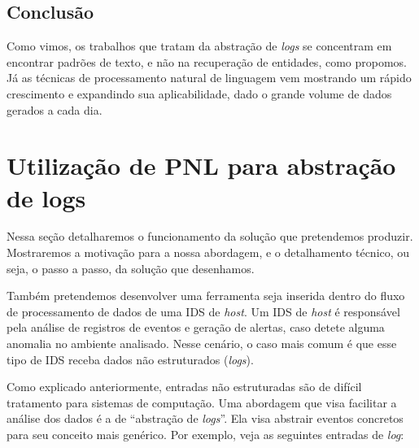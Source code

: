 \documentclass[
	12pt,				%
	openright,			%
	twoside,			%
	a4paper,			%
	english,			%
	spanish,			%
	brazil,				%
	]{abntex2}
\begin{document}



\section{Conclusão}
Como vimos, os trabalhos que tratam da abstração de \emph{logs} se concentram em encontrar padrões de texto, e não na recuperação de entidades, como propomos. Já as técnicas de processamento natural de linguagem vem mostrando um rápido crescimento e expandindo sua aplicabilidade, dado o grande volume de dados gerados a cada dia.

\chapter{Utilização de PNL para abstração de logs}\label{chap:proposta}

Nessa seção detalharemos o funcionamento da solução que pretendemos produzir. Mostraremos a motivação para a nossa abordagem, e o detalhamento técnico, ou seja, o passo a passo, da solução que desenhamos.

Também pretendemos desenvolver uma ferramenta seja inserida dentro do fluxo de processamento de dados de uma IDS de \emph{host}. Um IDS de \emph{host} é responsável pela análise de registros de eventos e geração de alertas, caso detete alguma anomalia no ambiente analisado. Nesse cenário, o caso mais comum é que esse tipo de IDS receba dados não estruturados (\emph{logs}). 

Como explicado anteriormente, entradas não estruturadas são de difícil tratamento para sistemas de computação. Uma abordagem que visa facilitar a análise dos dados é a de ``abstração de \emph{logs}''. Ela visa abstrair eventos concretos para seu conceito mais genérico. Por exemplo, veja as seguintes entradas de \emph{log}:
\end{document}

